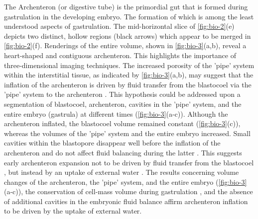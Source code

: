 \documentclass[
twoside,
openright,
titlepage,
numbers=noenddot,
headinclude,
fleqn,
a4paper,
footinclude=true,
cleardoublepage=empty,
abstractoff,
BCOR=5mm,
paper=a4,
fontsize=11pt,
british,ngerman,american,
]{scrreprt}
\begin{document}
The Archenteron (or digestive tube) is the primordial gut that is
formed during gastrulation in the developing embryo.  The formation of
which is among the least understood aspects of gastrulation.  The
mid-horizontal slice of \cref{fig:bio-2}(e) depicts two distinct,
hollow regions (black arrows) which appear to be merged in
\cref{fig:bio-2}(f).  Renderings of the entire volume, shown in
\cref{fig:bio-3}(a,b), reveal a heart-shaped and contiguous
archenteron.  This highlights the importance of three-dimensional
imaging techniques.  The increased porosity of the 'pipe' system
within the interstitial tissue, as indicated by \cref{fig:bio-3}(a,b),
may suggest that the inflation of the archenteron is driven by fluid
transfer from the blastocoel via the 'pipe' system to the archenteron
\cite{Ewald2004}.  This hypothesis could be addressed upon a
segmentation of blastocoel, archenteron, cavities in the 'pipe'
system, and the entire embryo (gastrula) at different times
(\cref{fig:bio-3}(a-c)).  Although the archenteron inflated, the
blastocoel volume remained constant (\cref{fig:bio-3}(c)), whereas the
volumes of the 'pipe' system and the entire embryo increased.  Small
cavities within the blastopore disappear well before the inflation of
the archenteron and do not affect fluid balancing during the latter
\cite{Moosmann2013nature}.  This suggests early archenteron expansion
not to be driven by fluid transfer from the blastocoel
\cite{Ewald2004}, but instead by an uptake of external water
\cite{Tuft1962}.  The results concerning volume changes of the
archenteron, the 'pipe' system, and the entire embryo
(\cref{fig:bio-3}(a-c)), the conservation of cell-mass volume during
gastrulation \cite{Tuft1962}, and the absence of additional cavities
in the embryonic fluid balance \cite{Moosmann2013nature} affirm
archenteron inflation to be driven by the uptake of external water.
\end{document}
